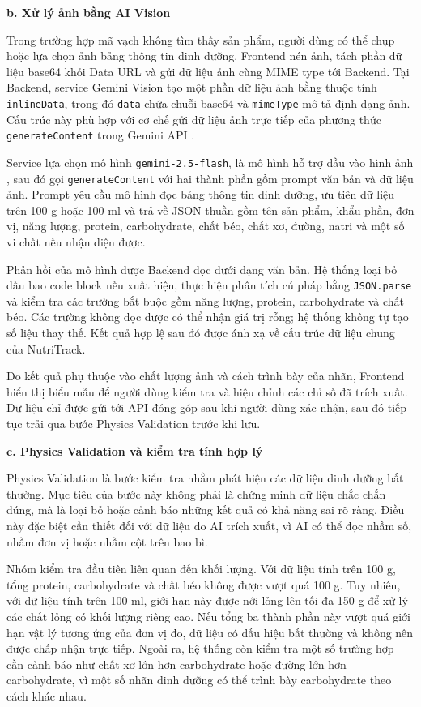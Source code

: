 \documentclass[12pt, a4paper]{report}
\begin{document}
\textbf{b. Xử lý ảnh bằng AI Vision}

Trong trường hợp mã vạch không tìm thấy sản phẩm, người dùng có thể chụp hoặc lựa chọn ảnh bảng thông tin dinh dưỡng. Frontend nén ảnh, tách phần dữ liệu base64 khỏi Data URL và gửi dữ liệu ảnh cùng MIME type tới Backend. Tại Backend, service Gemini Vision tạo một phần dữ liệu ảnh bằng thuộc tính \texttt{inlineData}, trong đó \texttt{data} chứa chuỗi base64 và \texttt{mimeType} mô tả định dạng ảnh. Cấu trúc này phù hợp với cơ chế gửi dữ liệu ảnh trực tiếp của phương thức \texttt{generateContent} trong Gemini API \cite{googleGeminiGenerateContent}.

Service lựa chọn mô hình \texttt{gemini-2.5-flash}, là mô hình hỗ trợ đầu vào hình ảnh \cite{googleGemini25Flash}, sau đó gọi \texttt{generateContent} với hai thành phần gồm prompt văn bản và dữ liệu ảnh. Prompt yêu cầu mô hình đọc bảng thông tin dinh dưỡng, ưu tiên dữ liệu trên 100 g hoặc 100 ml và trả về JSON thuần gồm tên sản phẩm, khẩu phần, đơn vị, năng lượng, protein, carbohydrate, chất béo, chất xơ, đường, natri và một số vi chất nếu nhận diện được.

Phản hồi của mô hình được Backend đọc dưới dạng văn bản. Hệ thống loại bỏ dấu bao code block nếu xuất hiện, thực hiện phân tích cú pháp bằng \texttt{JSON.parse} và kiểm tra các trường bắt buộc gồm năng lượng, protein, carbohydrate và chất béo. Các trường không đọc được có thể nhận giá trị rỗng; hệ thống không tự tạo số liệu thay thế. Kết quả hợp lệ sau đó được ánh xạ về cấu trúc dữ liệu chung của NutriTrack.

Do kết quả phụ thuộc vào chất lượng ảnh và cách trình bày của nhãn, Frontend hiển thị biểu mẫu để người dùng kiểm tra và hiệu chỉnh các chỉ số đã trích xuất. Dữ liệu chỉ được gửi tới API đóng góp sau khi người dùng xác nhận, sau đó tiếp tục trải qua bước Physics Validation trước khi lưu.

\textbf{c. Physics Validation và kiểm tra tính hợp lý}

Physics Validation là bước kiểm tra nhằm phát hiện các dữ liệu dinh dưỡng bất thường. Mục tiêu của bước này không phải là chứng minh dữ liệu chắc chắn đúng, mà là loại bỏ hoặc cảnh báo những kết quả có khả năng sai rõ ràng. Điều này đặc biệt cần thiết đối với dữ liệu do AI trích xuất, vì AI có thể đọc nhầm số, nhầm đơn vị hoặc nhầm cột trên bao bì.

Nhóm kiểm tra đầu tiên liên quan đến khối lượng. Với dữ liệu tính trên 100 g, tổng protein, carbohydrate và chất béo không được vượt quá 100 g. Tuy nhiên, với dữ liệu tính trên 100 ml, giới hạn này được nới lỏng lên tối đa 150 g để xử lý các chất lỏng có khối lượng riêng cao. Nếu tổng ba thành phần này vượt quá giới hạn vật lý tương ứng của đơn vị đo, dữ liệu có dấu hiệu bất thường và không nên được chấp nhận trực tiếp. Ngoài ra, hệ thống còn kiểm tra một số trường hợp cần cảnh báo như chất xơ lớn hơn carbohydrate hoặc đường lớn hơn carbohydrate, vì một số nhãn dinh dưỡng có thể trình bày carbohydrate theo cách khác nhau.
\end{document}
